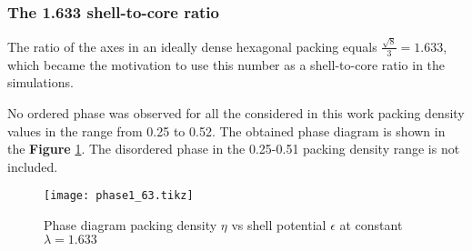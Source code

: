 \subsubsection{The 1.633 shell-to-core ratio}

The ratio of the axes in an ideally dense hexagonal packing equals $\frac{\sqrt{8}}{3}=1.633$, which became the motivation to use this number as a shell-to-core ratio in the simulations.

No ordered phase was observed for all the considered in this work packing density values in the range from 0.25 to 0.52.%
The obtained phase diagram is shown in the \textbf{Figure} \ref{fig:phase_1_63}. The disordered phase in the 0.25-0.51 packing density range is not included. 

\begin{figure}
\centering
\texttt{[image: phase1\_63.tikz]}
\caption{Phase diagram packing density $\eta$ vs shell potential $\epsilon$ at constant $\lambda=1.633$} \label{fig:phase_1_63}
\end{figure}

